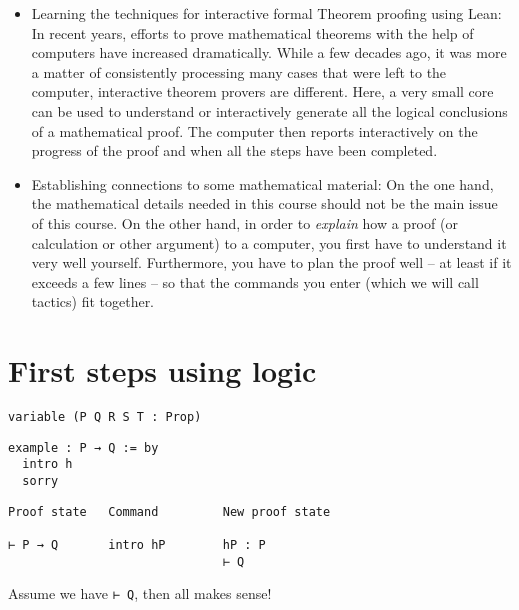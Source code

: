 \documentclass{memoir}
\begin{document}
\begin{itemize}
\item Learning the techniques for interactive formal Theorem proofing using Lean: In recent years, efforts to prove mathematical theorems with the help of computers have increased dramatically. While a few decades ago, it was more a matter of consistently processing many cases that were left to the computer, interactive theorem provers are different. Here, a very small core can be used to understand or interactively generate all the logical conclusions of a mathematical proof. The computer then reports interactively on the progress of the proof and when all the steps have been completed.\item Establishing connections to some mathematical material: On the one hand, the mathematical details needed in this course should not be the main issue of this course. On the other hand, in order to \emph{explain} how a proof (or calculation or other argument) to a computer, you first have to understand it very well yourself. Furthermore, you have to plan the proof well -- at least if it exceeds a few lines -- so that the commands you enter (which we will call tactics) fit together.
\end{itemize}





\chapter{First steps using logic}

\begin{verbatim}
variable (P Q R S T : Prop)

\end{verbatim}



\begin{verbatim}
example : P → Q := by
  intro h
  sorry

\end{verbatim}



\begin{verbatim}
Proof state   Command         New proof state

⊢ P → Q       intro hP        hP : P
                              ⊢ Q

\end{verbatim}


Assume we have \Verb|⊢ Q|, then all makes sense!
\end{document}
